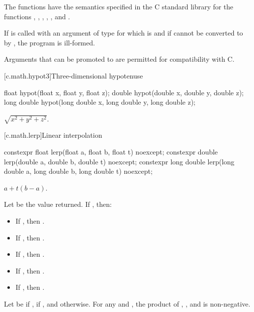 \begin{itemdescr}
\pnum
\effects
The 
functions have the semantics specified in the C standard library
for the functions , , ,
, , and .

\pnum
\remarks
If  is called with an argument of type 
for which  is  and
if  cannot be converted to 
by , the program is ill-formed.
\begin{note}
Arguments that can be promoted to  are permitted for compatibility with C.
\end{note}
\end{itemdescr}


[c.math.hypot3]{Three-dimensional hypotenuse}

%
\begin{itemdecl}
float hypot(float x, float y, float z);
double hypot(double x, double y, double z);
long double hypot(long double x, long double y, long double z);
\end{itemdecl}

\begin{itemdescr}
\pnum
\returns
$\sqrt{x^2+y^2+z^2}$.
\end{itemdescr}

[c.math.lerp]{Linear interpolation}

%
\begin{itemdecl}
constexpr float lerp(float a, float b, float t) noexcept;
constexpr double lerp(double a, double b, double t) noexcept;
constexpr long double lerp(long double a, long double b, long double t) noexcept;
\end{itemdecl}
\begin{itemdescr}
\pnum
\returns
$a+t(b-a)$.

\pnum
\remarks
Let  be the value returned.
If , then:
\begin{itemize}
\item If , then .
\item If , then .
\item If , then .
\item If , then .
\item If , then .
\end{itemize}
Let  be  if ,
 if , and  otherwise.
For any  and , the product of
,
, and
is non-negative.
\end{itemdescr}

